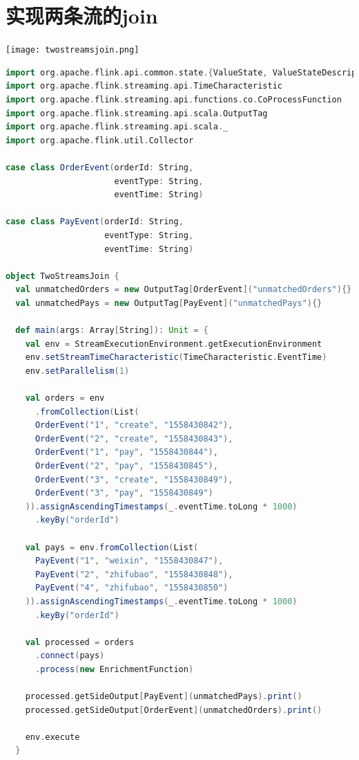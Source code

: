 \documentclass[oneside]{ctexbook}
\begin{document}
\section{实现两条流的join}

\noindent \texttt{[image: twostreamsjoin.png]}

\begin{lstlisting}[language=scala]
import org.apache.flink.api.common.state.{ValueState, ValueStateDescriptor}
import org.apache.flink.streaming.api.TimeCharacteristic
import org.apache.flink.streaming.api.functions.co.CoProcessFunction
import org.apache.flink.streaming.api.scala.OutputTag
import org.apache.flink.streaming.api.scala._
import org.apache.flink.util.Collector

case class OrderEvent(orderId: String,
                      eventType: String,
                      eventTime: String)

case class PayEvent(orderId: String,
                    eventType: String,
                    eventTime: String)

object TwoStreamsJoin {
  val unmatchedOrders = new OutputTag[OrderEvent]("unmatchedOrders"){}
  val unmatchedPays = new OutputTag[PayEvent]("unmatchedPays"){}

  def main(args: Array[String]): Unit = {
    val env = StreamExecutionEnvironment.getExecutionEnvironment
    env.setStreamTimeCharacteristic(TimeCharacteristic.EventTime)
    env.setParallelism(1)

    val orders = env
      .fromCollection(List(
      OrderEvent("1", "create", "1558430842"),
      OrderEvent("2", "create", "1558430843"),
      OrderEvent("1", "pay", "1558430844"),
      OrderEvent("2", "pay", "1558430845"),
      OrderEvent("3", "create", "1558430849"),
      OrderEvent("3", "pay", "1558430849")
    )).assignAscendingTimestamps(_.eventTime.toLong * 1000)
      .keyBy("orderId")

    val pays = env.fromCollection(List(
      PayEvent("1", "weixin", "1558430847"),
      PayEvent("2", "zhifubao", "1558430848"),
      PayEvent("4", "zhifubao", "1558430850")
    )).assignAscendingTimestamps(_.eventTime.toLong * 1000)
      .keyBy("orderId")

    val processed = orders
      .connect(pays)
      .process(new EnrichmentFunction)

    processed.getSideOutput[PayEvent](unmatchedPays).print()
    processed.getSideOutput[OrderEvent](unmatchedOrders).print()

    env.execute
  }


\end{lstlisting}
\end{document}
